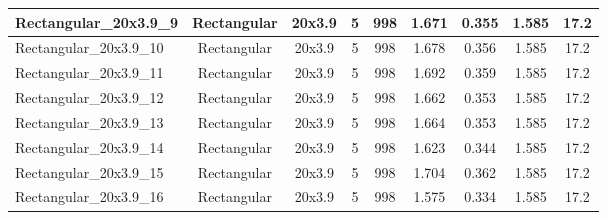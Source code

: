 \begin{table}
\begin{adjustbox}{max width = \linewidth}
\begin{tabular}{lcccccccc}
\multicolumn{1}{|l|}{Rectangular\_20x3.9\_9} & \multicolumn{1}{c|}{Rectangular} & \multicolumn{1}{c|}{20x3.9} & \multicolumn{1}{c|}{5} & \multicolumn{1}{c|}{998} & \multicolumn{1}{c|}{1.671} & \multicolumn{1}{c|}{0.355} & \multicolumn{1}{c|}{1.585} & \multicolumn{1}{c|}{17.2} \\ \hline
\multicolumn{1}{|l|}{Rectangular\_20x3.9\_10} & \multicolumn{1}{c|}{Rectangular} & \multicolumn{1}{c|}{20x3.9} & \multicolumn{1}{c|}{5} & \multicolumn{1}{c|}{998} & \multicolumn{1}{c|}{1.678} & \multicolumn{1}{c|}{0.356} & \multicolumn{1}{c|}{1.585} & \multicolumn{1}{c|}{17.2} \\ \hline
\multicolumn{1}{|l|}{Rectangular\_20x3.9\_11} & \multicolumn{1}{c|}{Rectangular} & \multicolumn{1}{c|}{20x3.9} & \multicolumn{1}{c|}{5} & \multicolumn{1}{c|}{998} & \multicolumn{1}{c|}{1.692} & \multicolumn{1}{c|}{0.359} & \multicolumn{1}{c|}{1.585} & \multicolumn{1}{c|}{17.2} \\ \hline
\multicolumn{1}{|l|}{Rectangular\_20x3.9\_12} & \multicolumn{1}{c|}{Rectangular} & \multicolumn{1}{c|}{20x3.9} & \multicolumn{1}{c|}{5} & \multicolumn{1}{c|}{998} & \multicolumn{1}{c|}{1.662} & \multicolumn{1}{c|}{0.353} & \multicolumn{1}{c|}{1.585} & \multicolumn{1}{c|}{17.2} \\ \hline
\multicolumn{1}{|l|}{Rectangular\_20x3.9\_13} & \multicolumn{1}{c|}{Rectangular} & \multicolumn{1}{c|}{20x3.9} & \multicolumn{1}{c|}{5} & \multicolumn{1}{c|}{998} & \multicolumn{1}{c|}{1.664} & \multicolumn{1}{c|}{0.353} & \multicolumn{1}{c|}{1.585} & \multicolumn{1}{c|}{17.2} \\ \hline
\multicolumn{1}{|l|}{Rectangular\_20x3.9\_14} & \multicolumn{1}{c|}{Rectangular} & \multicolumn{1}{c|}{20x3.9} & \multicolumn{1}{c|}{5} & \multicolumn{1}{c|}{998} & \multicolumn{1}{c|}{1.623} & \multicolumn{1}{c|}{0.344} & \multicolumn{1}{c|}{1.585} & \multicolumn{1}{c|}{17.2} \\ \hline
\multicolumn{1}{|l|}{Rectangular\_20x3.9\_15} & \multicolumn{1}{c|}{Rectangular} & \multicolumn{1}{c|}{20x3.9} & \multicolumn{1}{c|}{5} & \multicolumn{1}{c|}{998} & \multicolumn{1}{c|}{1.704} & \multicolumn{1}{c|}{0.362} & \multicolumn{1}{c|}{1.585} & \multicolumn{1}{c|}{17.2} \\ \hline
\multicolumn{1}{|l|}{Rectangular\_20x3.9\_16} & \multicolumn{1}{c|}{Rectangular} & \multicolumn{1}{c|}{20x3.9} & \multicolumn{1}{c|}{5} & \multicolumn{1}{c|}{998} & \multicolumn{1}{c|}{1.575} & \multicolumn{1}{c|}{0.334} & \multicolumn{1}{c|}{1.585} & \multicolumn{1}{c|}{17.2} \\ \hline

\end{tabular}
\end{adjustbox}
\end{table}
